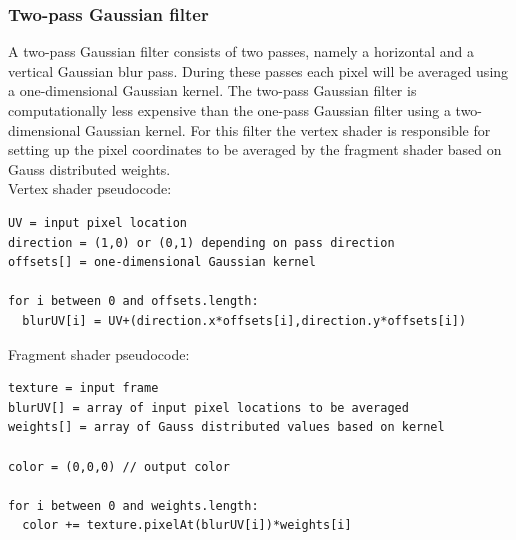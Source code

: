 \documentclass[11pt,a4paper,twoside,openright]{report}
\begin{document}
\subsubsection{Two-pass Gaussian filter}
A two-pass Gaussian filter consists of two passes, namely a horizontal and a vertical Gaussian blur pass. During these passes each pixel will be averaged using a one-dimensional Gaussian kernel. The two-pass Gaussian filter is computationally less expensive than the one-pass Gaussian filter using a two-dimensional Gaussian kernel. For this filter the vertex shader is responsible for setting up the pixel coordinates to be averaged by the fragment shader based on Gauss distributed weights.
\\
Vertex shader pseudocode:
\begin{lstlisting}[caption=Two-pass Gaussian filter vertex shader]
UV = input pixel location
direction = (1,0) or (0,1) depending on pass direction
offsets[] = one-dimensional Gaussian kernel

for i between 0 and offsets.length:
  blurUV[i] = UV+(direction.x*offsets[i],direction.y*offsets[i])
\end{lstlisting}
Fragment shader pseudocode:
\begin{lstlisting}[caption=Two-pass Gaussian filter fragment shader]
texture = input frame
blurUV[] = array of input pixel locations to be averaged
weights[] = array of Gauss distributed values based on kernel

color = (0,0,0) // output color

for i between 0 and weights.length:
  color += texture.pixelAt(blurUV[i])*weights[i]
\end{lstlisting}
\end{document}

